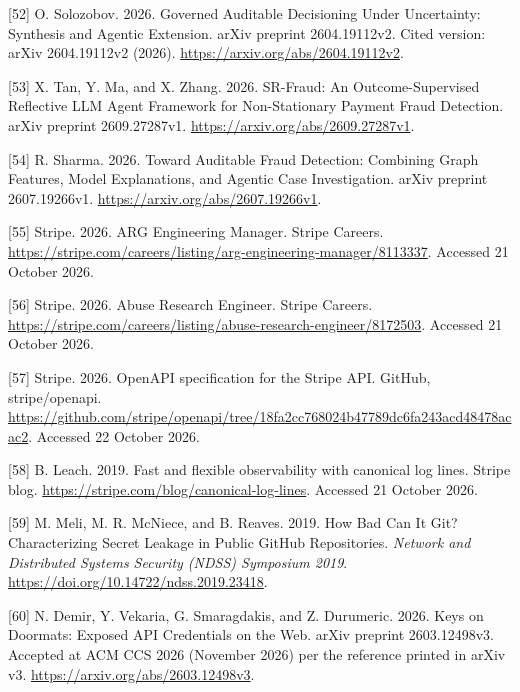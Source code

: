 \documentclass[
  11pt,
]{article}
\newlength{\cslhangindent}
\newlength{\cslentryspacingunit} %
\newenvironment{CSLReferences}[2] %
 {%
  \setlength{\parindent}{0pt}
  \ifodd #1
  \let\oldpar\par
  \def\par{\hangindent=\cslhangindent\oldpar}
  \fi
  \setlength{\parskip}{#2\cslentryspacingunit}
 }%
 {}
\begin{document}
\begin{CSLReferences}{1}{1}
\leavevmode{}%
{[}52{]} O. Solozobov. 2026. Governed Auditable Decisioning Under
Uncertainty: Synthesis and Agentic Extension. arXiv preprint
2604.19112v2. Cited version: arXiv 2604.19112v2 (2026).
\url{https://arxiv.org/abs/2604.19112v2}.

\leavevmode{}%
{[}53{]} X. Tan, Y. Ma, and X. Zhang. 2026. SR-Fraud: An
Outcome-Supervised Reflective LLM Agent Framework for Non-Stationary
Payment Fraud Detection. arXiv preprint 2609.27287v1.
\url{https://arxiv.org/abs/2609.27287v1}.

\leavevmode{}%
{[}54{]} R. Sharma. 2026. Toward Auditable Fraud Detection: Combining
Graph Features, Model Explanations, and Agentic Case Investigation.
arXiv preprint 2607.19266v1. \url{https://arxiv.org/abs/2607.19266v1}.

\leavevmode{}%
{[}55{]} Stripe. 2026. ARG Engineering Manager. Stripe Careers.
\url{https://stripe.com/careers/listing/arg-engineering-manager/8113337}.
Accessed 21 October 2026.

\leavevmode{}%
{[}56{]} Stripe. 2026. Abuse Research Engineer. Stripe Careers.
\url{https://stripe.com/careers/listing/abuse-research-engineer/8172503}.
Accessed 21 October 2026.

\leavevmode{}%
{[}57{]} Stripe. 2026. OpenAPI specification for the Stripe API. GitHub,
stripe/openapi.
\url{https://github.com/stripe/openapi/tree/18fa2cc768024b47789dc6fa243acd48478acac2}.
Accessed 22 October 2026.

\leavevmode{}%
{[}58{]} B. Leach. 2019. Fast and flexible observability with canonical
log lines. Stripe blog.
\url{https://stripe.com/blog/canonical-log-lines}. Accessed 21 October
2026.

\leavevmode{}%
{[}59{]} M. Meli, M. R. McNiece, and B. Reaves. 2019. How Bad Can It
Git? Characterizing Secret Leakage in Public GitHub Repositories.
\emph{Network and Distributed Systems Security (NDSS) Symposium 2019}.
\url{https://doi.org/10.14722/ndss.2019.23418}.

\leavevmode{}%
{[}60{]} N. Demir, Y. Vekaria, G. Smaragdakis, and Z. Durumeric. 2026.
Keys on Doormats: Exposed API Credentials on the Web. arXiv preprint
2603.12498v3. Accepted at ACM CCS 2026 (November 2026) per the reference
printed in arXiv v3. \url{https://arxiv.org/abs/2603.12498v3}.


\end{CSLReferences}
\end{document}
